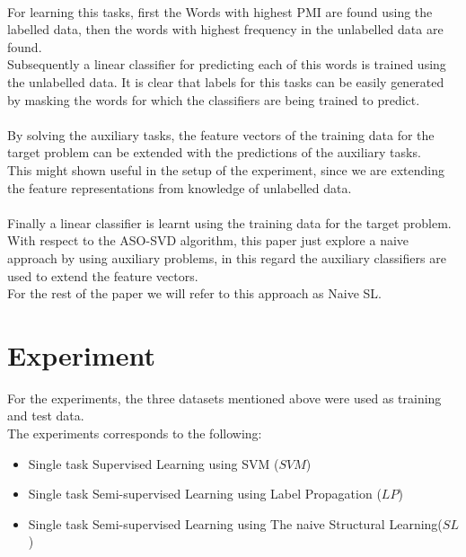 \documentclass[4pt,a4paper,twocolumn]{article}
\begin{document}
\\
For learning this tasks, first the Words with highest PMI are found using the labelled data, then the words with highest frequency in the unlabelled data are found.\\
Subsequently a linear classifier for predicting each of this words is trained using the unlabelled data.
It is clear that labels for this tasks can be easily generated by masking the words for which the classifiers are being trained to predict.\\
\\
By solving the auxiliary tasks, the feature vectors of the training data for the target problem can be extended with the predictions of the auxiliary tasks.\\
This might shown useful in the setup of the experiment, since we are extending the feature representations from knowledge of unlabelled data.\\
\\
Finally a linear classifier is learnt using the training data for the target problem.\\
With respect to the ASO-SVD algorithm, this paper just explore a naive approach by using auxiliary problems, in this regard the auxiliary classifiers are used to extend the feature vectors.\\
For the rest of the paper we will refer to this approach as Naive SL.


\section{Experiment}
For the experiments, the three datasets mentioned above were used as training and test data.\\
The experiments corresponds to the following:
\begin{itemize}
	\item Single task Supervised Learning using SVM ($SVM$)
	\item Single task Semi-supervised Learning using Label Propagation ($LP$)
	\item Single task Semi-supervised Learning using The naive Structural Learning($SL$)
	
\end{itemize}
\end{document}
